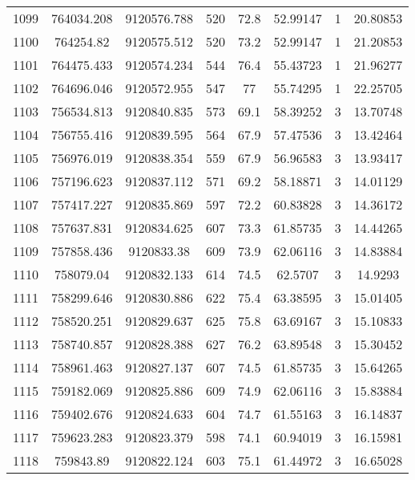 \begin{longtable}{cccccccc}
1099 & 764034.208      & 9120576.788      & 520     & 72.8  & 52.99147 & 1  & 20.80853 \\
1100 & 764254.82       & 9120575.512      & 520     & 73.2  & 52.99147 & 1  & 21.20853 \\
1101 & 764475.433      & 9120574.234      & 544     & 76.4  & 55.43723 & 1  & 21.96277 \\
1102 & 764696.046      & 9120572.955      & 547     & 77    & 55.74295 & 1  & 22.25705 \\
1103 & 756534.813      & 9120840.835      & 573     & 69.1  & 58.39252 & 3  & 13.70748 \\
1104 & 756755.416      & 9120839.595      & 564     & 67.9  & 57.47536 & 3  & 13.42464 \\
1105 & 756976.019      & 9120838.354      & 559     & 67.9  & 56.96583 & 3  & 13.93417 \\
1106 & 757196.623      & 9120837.112      & 571     & 69.2  & 58.18871 & 3  & 14.01129 \\
1107 & 757417.227      & 9120835.869      & 597     & 72.2  & 60.83828 & 3  & 14.36172 \\
1108 & 757637.831      & 9120834.625      & 607     & 73.3  & 61.85735 & 3  & 14.44265 \\
1109 & 757858.436      & 9120833.38       & 609     & 73.9  & 62.06116 & 3  & 14.83884 \\
1110 & 758079.04       & 9120832.133      & 614     & 74.5  & 62.5707  & 3  & 14.9293  \\
1111 & 758299.646      & 9120830.886      & 622     & 75.4  & 63.38595 & 3  & 15.01405 \\
1112 & 758520.251      & 9120829.637      & 625     & 75.8  & 63.69167 & 3  & 15.10833 \\
1113 & 758740.857      & 9120828.388      & 627     & 76.2  & 63.89548 & 3  & 15.30452 \\
1114 & 758961.463      & 9120827.137      & 607     & 74.5  & 61.85735 & 3  & 15.64265 \\
1115 & 759182.069      & 9120825.886      & 609     & 74.9  & 62.06116 & 3  & 15.83884 \\
1116 & 759402.676      & 9120824.633      & 604     & 74.7  & 61.55163 & 3  & 16.14837 \\
1117 & 759623.283      & 9120823.379      & 598     & 74.1  & 60.94019 & 3  & 16.15981 \\
1118 & 759843.89       & 9120822.124      & 603     & 75.1  & 61.44972 & 3  & 16.65028 \\

\end{longtable}
